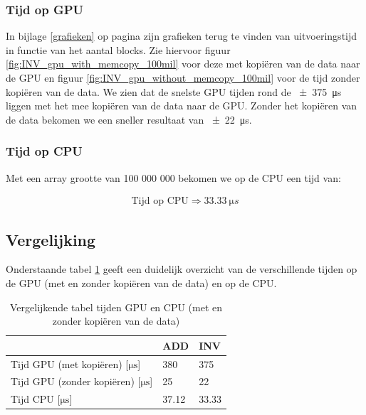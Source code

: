 \documentclass[twoside,a4paper]{article}
\begin{document}
\subsubsection{Tijd op GPU}
In bijlage \ref{grafieken} op pagina \pageref{grafieken} zijn grafieken terug te vinden van uitvoeringstijd in functie van het aantal blocks.
Zie hiervoor figuur \ref{fig:INV_gpu_with_memcopy_100mil} voor deze met kopi\"eren van de data naar de GPU en figuur \ref{fig:INV_gpu_without_memcopy_100mil} voor de tijd zonder kopi\"eren van de data.
We zien dat de snelste GPU tijden rond de \SI{\pm375}{\micro s} liggen met het mee kopi\"eren van de data naar de GPU. Zonder het kopi\"eren van de data bekomen we een sneller resultaat van \SI{\pm22}{\micro s}.


\subsubsection{Tijd op CPU}
Met een array grootte van 100 000 000 bekomen we op de CPU een tijd van:

\begin{align*}
    \text{Tijd op CPU} \Rightarrow \SI{33.33}{\micro s}
\end{align*}



\subsection{Vergelijking}
Onderstaande tabel \ref{tab:vgl} geeft een duidelijk overzicht van de verschillende tijden op de GPU (met en zonder kopi\"eren van de data) en op de CPU.

\begin{table}[h!]
    \centering
    \begin{tabular}{@{}lll@{}}
    \toprule
                                      & ADD   & INV   \\ \midrule
    Tijd GPU (met kopi\"eren) [$\mathrm{\mu s}$] & 380   & 375   \\
    Tijd GPU (zonder kopi\"eren) [$\mathrm{\mu s}$]   & 25    & 22    \\
    Tijd CPU [$\mathrm{\mu s}$]                         & 37.12 & 33.33 \\ \bottomrule
    \end{tabular}
    \caption{Vergelijkende tabel tijden GPU en CPU (met en zonder kopi\"eren van de data)}
    \label{tab:vgl}
    \end{table}
\end{document}
